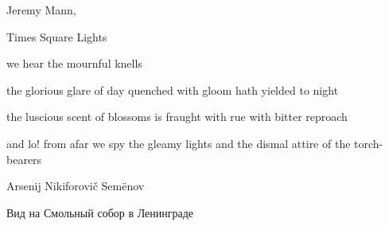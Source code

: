 \begin{volumetitlepage}
	\bigskip\bigskip\bigskip
\end{volumetitlepage}


\begin{artItem}
	Jeremy Mann, \begin{otherlanguage}{english}%
		Times Square Lights%
	\end{otherlanguage}
\end{artItem}

\begin{poem}
	\begin{otherlanguage}{english}
		\begin{stanza}
			we hear the mournful knells
		\end{stanza}

		\begin{stanza}
			the glorious glare of day\verseline
			quenched with gloom\verseline
			hath yielded to night
		\end{stanza}

		\begin{stanza}
			the luscious scent of blossoms\verseline
			is fraught with rue\verseline
			with bitter reproach
		\end{stanza}

		\begin{stanza}
			and lo! from afar we spy\verseline
			the gleamy lights\verseline
			and the dismal attire\verseline
			of the torch-bearers
		\end{stanza}
\end{otherlanguage}
\end{poem}

\clearpage


\begin{artItem}
	Arsenij Nikiforovič Semënov \begin{otherlanguage}{russian}%
		Вид на Смольный собор в Ленинграде%
	\end{otherlanguage}
\end{artItem}

